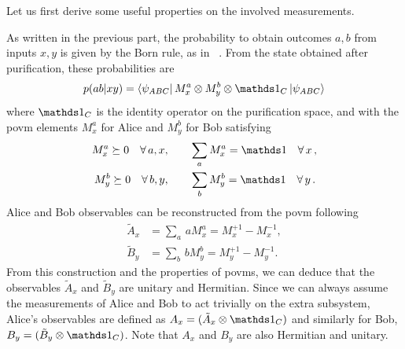 \medbreak

Let us first derive some useful properties on the involved measurements.

As written in the previous part, the probability to obtain outcomes $a,b$ from inputs $x,y$ is given by the Born rule, as in ~. 
From the state obtained after purification, these probabilities are
\begin{equation}
	p(ab|xy) = \bra{\psi_{ABC}} M^a_x \otimes M^b_y \otimes \id_C \ket{\psi_{ABC}}
\end{equation}
where $\id_C$ is the identity operator on the purification space, and with the \acrshort{povm} elements $M^a_x$ for Alice and $M^b_y$ for Bob satisfying
\begin{equation}
	\begin{split}
		M^{a}_x \succeq 0 \quad \forall\,a,x, &\qquad \sum_a M^a_x = \id \quad \forall\,x\, ,\\
		M^{b}_y \succeq 0 \quad \forall\,b,y, &\qquad \sum_b M^b_y = \id \quad \forall\,y\, .
	\end{split}
\end{equation}
Alice and Bob observables can be reconstructed from the \acrshort{povm} following
\begin{equation}
	\begin{split}
		\tilde{A}_x &= \sum_a \,a M^a_x = M^{+1}_x - M^{-1}_x, \\
		\tilde{B}_y &= \sum_b \,b M^b_y = M^{+1}_y - M^{-1}_y.
	\end{split}	
\end{equation}
From this construction and the properties of \acrshort{povm}s, we can deduce that the observables $\tilde{A}_x$ and $\tilde{B}_y$ are unitary and Hermitian.
Since we can always assume the measurements of Alice and Bob to act trivially on the extra subsystem, Alice's observables are defined as $A_x = (\tilde{A}_x \otimes \id_C)$ and similarly for Bob, $B_y=(\tilde{B}_y \otimes \id_C)$. 
Note that $A_x$ and $B_y$ are also Hermitian and unitary.
 
\medbreak

